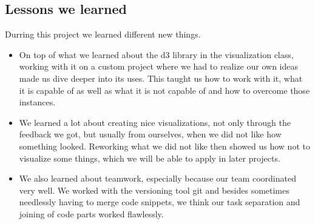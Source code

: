 \documentclass{vgtc}                          %
\begin{document}
\subsection{Lessons we learned}

Durring this project we learned different new things.

\begin{itemize}
\item On top of what we learned about the d3 library in the visualization class, working with it on a custom project where we had to realize our own ideas made us dive deeper into its uses. This taught us how to work with it, what it is capable of as well as what it is not capable of and how to overcome those instances.
\item We learned a lot about creating nice visualizations, not only through the feedback we got, but usually from ourselves, when we did not like how something looked. Reworking what we did not like then showed us how not to visualize some things, which we will be able to apply in later projects.
\item We also learned about teamwork, especially because our team coordinated very well. We worked with the versioning tool git and besides sometimes needlessly having to merge code snippets, we think our task separation and joining of code parts worked flawlessly.
\end{itemize}
\end{document}
